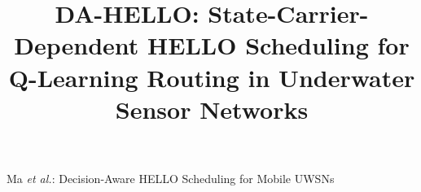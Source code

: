 \documentclass[journal]{IEEEtran}
\begin{document}
\title{DA-HELLO: State-Carrier-Dependent HELLO Scheduling for
Q-Learning Routing in Underwater Sensor Networks}



%
{Ma \MakeLowercase{\textit{et al.}}: Decision-Aware HELLO Scheduling for Mobile UWSNs}

\maketitle








\FloatBarrier


{\footnotesize


}
\end{document}
